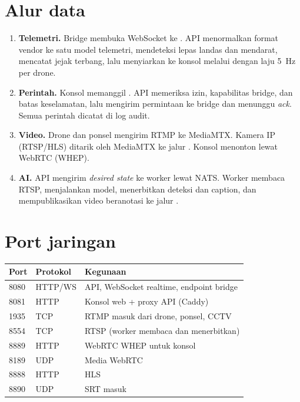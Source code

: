\section{Alur data}
\begin{enumerate}
\item \textbf{Telemetri.} Bridge membuka WebSocket ke . API menormalkan format vendor ke satu model telemetri, mendeteksi lepas landas dan mendarat, mencatat jejak terbang, lalu menyiarkan ke konsol melalui  dengan laju 5~Hz per drone.
\item \textbf{Perintah.} Konsol memanggil . API memeriksa izin, kapabilitas bridge, dan batas keselamatan, lalu mengirim permintaan ke bridge dan menunggu \emph{ack}. Semua perintah dicatat di log audit.
\item \textbf{Video.} Drone dan ponsel mengirim RTMP ke MediaMTX. Kamera IP (RTSP/HLS) ditarik oleh MediaMTX ke jalur . Konsol menonton lewat WebRTC (WHEP).
\item \textbf{AI.} API mengirim \emph{desired state} ke worker lewat NATS. Worker membaca RTSP, menjalankan model, menerbitkan deteksi dan caption, dan mempublikasikan video beranotasi ke jalur .
\end{enumerate}

\section{Port jaringan}

\noindent\begin{tabularx}{\linewidth}{@{}l l X@{}}
\toprule
Port & Protokol & Kegunaan \\ \midrule
8080 & HTTP/WS & API, WebSocket realtime, endpoint bridge \\
8081 & HTTP & Konsol web + proxy API (Caddy) \\
1935 & TCP & RTMP masuk dari drone, ponsel, CCTV \\
8554 & TCP & RTSP (worker membaca dan menerbitkan) \\
8889 & HTTP & WebRTC WHEP untuk konsol \\
8189 & UDP & Media WebRTC \\
8888 & HTTP & HLS \\
8890 & UDP & SRT masuk \\
\bottomrule
\end{tabularx}

